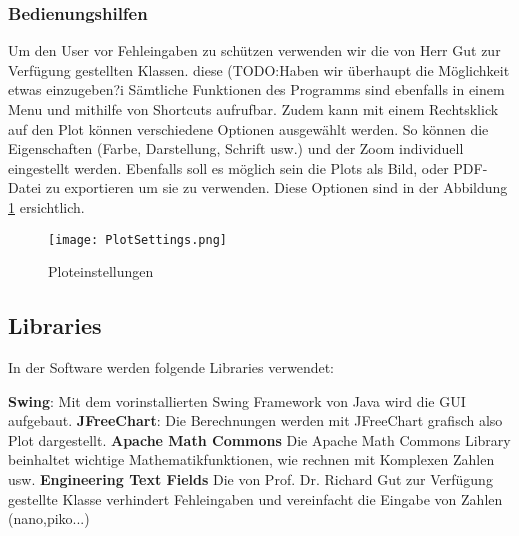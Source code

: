 \subsubsection{Bedienungshilfen}\label{subsubsec:bedienungshilfen}
Um den User vor Fehleingaben zu schützen verwenden wir die von Herr Gut zur Verfügung gestellten Klassen. diese (TODO:Haben wir überhaupt die Möglichkeit etwas einzugeben?^^)
Sämtliche Funktionen des Programms sind ebenfalls in einem Menu und mithilfe von Shortcuts aufrufbar.
Zudem kann mit einem Rechtsklick auf den Plot können verschiedene Optionen ausgewählt werden. So können die Eigenschaften (Farbe, Darstellung, Schrift usw.) und der Zoom individuell eingestellt werden. Ebenfalls soll es möglich sein die Plots als Bild, oder PDF-Datei zu exportieren um sie zu verwenden. Diese Optionen sind in der Abbildung \ref{fig:PlotSettings} ersichtlich.
\begin{figure}[H]
	\centering
	\texttt{[image: PlotSettings.png]}
	\caption{Ploteinstellungen}
	\label{fig:PlotSettings}
\end{figure} 
\bigskip


\begin{comment}
\paragraph{Simulation} \label{para:simulation}
Im Menupunkt "Simulation" kann die Simulationsart Monte Carlo ausgewählt werden(F8, Tabelle:\ref{tab:ziele}). Es öffnet sich ein neues Fenster in dem der Parameter, die Toleranz und die Anzahl Messungen eingestellt werden kann. Dieser Menupunkt ist in der Abbildung \ref{fig:GUISimulation} dargestellt.

\begin{figure}[H]
	\centering
	\texttt{[image: GUISimulation.png]}
	\caption{Menuoption Simulation}
	\label{fig:GUISimulation}
\end{figure}
\end{comment}


\subsection{Libraries} \label{subsec:Libraries}

In der Software werden folgende Libraries verwendet:

\textbf{Swing}: Mit dem vorinstallierten Swing Framework von Java wird die GUI aufgebaut.
\textbf{JFreeChart}: Die Berechnungen werden mit JFreeChart grafisch also Plot dargestellt. \cite{jfreechart}
\textbf{Apache Math Commons} Die Apache Math Commons Library beinhaltet wichtige Mathematikfunktionen, wie rechnen mit Komplexen Zahlen usw. \cite{apache}
\textbf{Engineering Text Fields} Die von Prof. Dr. Richard Gut zur Verfügung gestellte Klasse verhindert Fehleingaben und vereinfacht die Eingabe von Zahlen (nano,piko...)

\newpage
